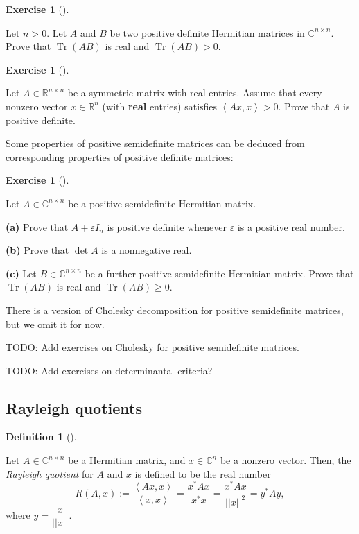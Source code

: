 \documentclass[numbers=enddot,12pt,final,onecolumn,notitlepage]{scrartcl}%
\newcounter{exer}
\numberwithin{exer}{subsection}
\theoremstyle{definition}
\newtheorem{defi}[theo]{Definition}
\newenvironment{definition}[1][]
{\begin{defi}[#1]\begin{leftbar}}
{\end{leftbar}\end{defi}}
\newtheorem{exmp}[exer]{Exercise}
\newenvironment{exercise}[1][]
{\begin{exmp}[#1]\begin{leftbar}}
{\end{leftbar}\end{exmp}}
\newenvironment{noncompile}{}{}
\begin{document}
\begin{exercise}
 Let $n>0$. Let $A$ and $B$ be two positive definite Hermitian
matrices in $\mathbb{C}^{n\times n}$. Prove that $\operatorname*{Tr}\left(
AB\right)  $ is real and $\operatorname*{Tr}\left(  AB\right)  >0$.
\end{exercise}

\begin{exercise}
 Let $A\in\mathbb{R}^{n\times n}$ be a symmetric matrix with real
entries. Assume that every nonzero vector $x\in\mathbb{R}^{n}$ (with
\textbf{real} entries) satisfies $\left\langle Ax,x\right\rangle >0$. Prove
that $A$ is positive definite.
\end{exercise}

Some properties of positive semidefinite matrices can be deduced from
corresponding properties of positive definite matrices:

\begin{exercise}
 Let $A\in\mathbb{C}^{n\times n}$ be a positive semidefinite Hermitian
matrix. \medskip

\textbf{(a)} Prove that $A+\varepsilon I_{n}$ is positive definite whenever
$\varepsilon$ is a positive real number. \medskip

\textbf{(b)} Prove that $\det A$ is a nonnegative real. \medskip

\textbf{(c)} Let $B\in\mathbb{C}^{n\times n}$ be a further positive
semidefinite Hermitian matrix. Prove that $\operatorname*{Tr}\left(
AB\right)  $ is real and $\operatorname*{Tr}\left(  AB\right)  \geq0$.
\end{exercise}

There is a version of Cholesky decomposition for positive semidefinite
matrices, but we omit it for now.

\begin{noncompile}
TODO: Add exercises on Cholesky for positive semidefinite matrices.

TODO: Add exercises on determinantal criteria?
\end{noncompile}

\subsection{Rayleigh quotients}

\begin{definition}
Let $A\in\mathbb{C}^{n\times n}$ be a Hermitian matrix, and $x\in
\mathbb{C}^{n}$ be a nonzero vector. Then, the \emph{Rayleigh quotient} for
$A$ and $x$ is defined to be the real number%
\[
R\left(  A,x\right)  :=\dfrac{\left\langle Ax,x\right\rangle }{\left\langle
x,x\right\rangle }=\dfrac{x^{\ast}Ax}{x^{\ast}x}=\dfrac{x^{\ast}Ax}{\left\vert
\left\vert x\right\vert \right\vert ^{2}}=y^{\ast}Ay,
\]
where $y=\dfrac{x}{\left\vert \left\vert x\right\vert \right\vert }$.
\end{definition}
\end{document}
